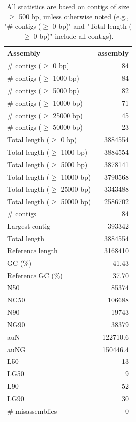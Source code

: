 \documentclass[12pt,a4paper]{article}
\begin{document}
\begin{table}[ht]
\begin{center}
\caption{All statistics are based on contigs of size $\geq$ 500 bp, unless otherwise noted (e.g., "\# contigs ($\geq$ 0 bp)" and "Total length ($\geq$ 0 bp)" include all contigs).}
\begin{tabular}{|l*{1}{|r}|}
\hline
Assembly & assembly \\ \hline
\# contigs ($\geq$ 0 bp) & 84 \\ \hline
\# contigs ($\geq$ 1000 bp) & 84 \\ \hline
\# contigs ($\geq$ 5000 bp) & 82 \\ \hline
\# contigs ($\geq$ 10000 bp) & 71 \\ \hline
\# contigs ($\geq$ 25000 bp) & 45 \\ \hline
\# contigs ($\geq$ 50000 bp) & 23 \\ \hline
Total length ($\geq$ 0 bp) & 3884554 \\ \hline
Total length ($\geq$ 1000 bp) & 3884554 \\ \hline
Total length ($\geq$ 5000 bp) & 3878141 \\ \hline
Total length ($\geq$ 10000 bp) & 3790568 \\ \hline
Total length ($\geq$ 25000 bp) & 3343488 \\ \hline
Total length ($\geq$ 50000 bp) & 2586702 \\ \hline
\# contigs & 84 \\ \hline
Largest contig & 393342 \\ \hline
Total length & 3884554 \\ \hline
Reference length & 3168410 \\ \hline
GC (\%) & 41.43 \\ \hline
Reference GC (\%) & 37.70 \\ \hline
N50 & 85374 \\ \hline
NG50 & 106688 \\ \hline
N90 & 19743 \\ \hline
NG90 & 38379 \\ \hline
auN & 122710.6 \\ \hline
auNG & 150446.4 \\ \hline
L50 & 13 \\ \hline
LG50 & 9 \\ \hline
L90 & 52 \\ \hline
LG90 & 30 \\ \hline
\# misassemblies & 0 \\ \hline

\end{tabular}
\end{center}
\end{table}
\end{document}
